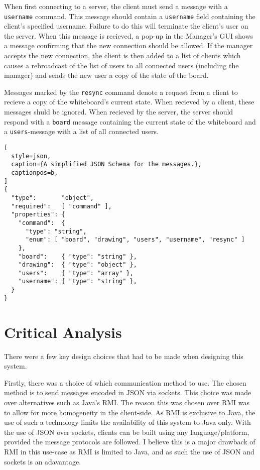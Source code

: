 \documentclass[12pt]{article}
\begin{document}
When first connecting to a server, the client must send a message with a \texttt{username} command. This message should contain a \texttt{username} field containing the client's specified username. Failure to do this will terminate the client's user on the server. When this message is recieved, a pop-up in the Manager's GUI shows a message confirming that the new connection should be allowed. If the manager accepts the new connection, the client is then added to a list of clients which causes a rebroadcast of the list of users to all connected users (including the manager) and sends the new user a copy of the state of the board. 

Messages marked by the \texttt{resync} command denote a request from a client to recieve a copy of the whiteboard's current state. When recieved by a client, these messages shuld be ignored. When recieved by the server, the server should respond with a \texttt{board} message containing the current state of the whiteboard and a \texttt{users}-message with a list of all connected users.

\begin{lstlisting}[
  style=json, 
  caption={A simplified JSON Schema for the messages.},
  captionpos=b,
]
{
  "type":       "object",
  "required":   [ "command" ],
  "properties": {
    "command":  {
      "type": "string",
      "enum": [ "board", "drawing", "users", "username", "resync" ]
    },
    "board":    { "type": "string" },
    "drawing":  { "type": "object" },
    "users":    { "type": "array" },
    "username": { "type": "string" },
  }
}
\end{lstlisting}

\newpage

\section{Critical Analysis}
There were a few key design choices that had to be made when designing this system. 

Firstly, there was a choice of which communication method to use. The chosen method is to send messages encoded in JSON via sockets. This choice was made over alternatives such as Java's RMI. The reason this was chosen over RMI was to allow for more homogeneity in the client-side. As RMI is exclusive to Java, the use of such a technology limits the availability of this system to Java only. With the use of JSON over sockets, clients can be built using any language/platform, provided the message protocols are followed. I believe this is a major drawback of RMI in this use-case as RMI is limited to Java, and as such the use of JSON and sockets is an adavantage. 
\end{document}
